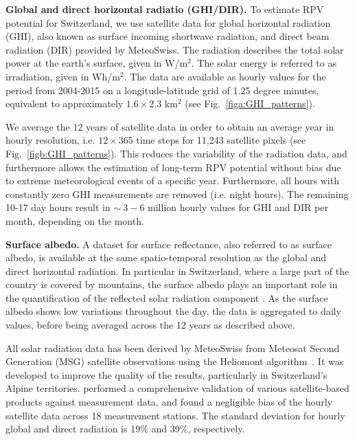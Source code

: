 \textbf{Global and direct horizontal radiatio (GHI/DIR).} To estimate RPV potential for Switzerland, we use satellite data for global horizontal radiation (GHI), also known as surface incoming shortwave radiation, and direct beam radiation (DIR) provided by MeteoSwiss\cite{stockli_daily_2013}. The radiation describes the total solar power at the earth's surface, given in W/m$^2$. The solar energy is referred to as irradiation, given in Wh/m$^2$. The data are available as hourly values for the period from 2004-2015 on a longitude-latitude grid of 1.25 degree minutes, equivalent to approximately $1.6 \times 2.3$ km$^2$ (see Fig.~\ref{figa:GHI_patterns}).  

We average the 12 years of satellite data in order to obtain an average year in hourly resolution, i.e. $12 \times 365$ time steps for 11,243 satellite pixels (see Fig.~\ref{figb:GHI_patterns}). This reduces the variability of the radiation data, and furthermore allows the estimation of long-term RPV potential without bias due to extreme meteorological events of a specific year. Furthermore, all hours with constantly zero GHI measurements are removed (i.e. night hours). The remaining 10-17 day hours result in $\sim~3-6$ million hourly values for GHI and DIR per month, depending on the month. 

\textbf{Surface albedo.} A dataset for surface reflectance, also referred to as surface albedo, is available at the same spatio-temporal resolution as the global and direct horizontal radiation. In particular in Switzerland, where a large part of the country is covered by mountains, the surface albedo plays an important role in the quantification of the reflected solar radiation component \cite{kahl_bright_2019}. As the surface albedo shows low variations throughout the day, the data is aggregated to daily values, before being averaged across the 12 years as described above. 

All solar radiation data has been derived by MeteoSwiss from Meteosat Second Generation (MSG) satellite observations using the Heliomont algorithm~\cite{stockli_heliomont_2017}. It was developed to improve the quality of the results, particularly in Switzerland's Alpine territories. 
\citet{ineichen_long_2014} performed a comprehensive validation of various satellite-based products against measurement data, and found a negligible bias of the hourly satellite data across 18 measurement stations. 
The standard deviation for hourly global and direct radiation is 19\% and 39\%, respectively.

